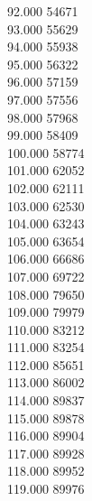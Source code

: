 { 92.000	54671 \\
 93.000	55629 \\
 94.000	55938 \\
 95.000	56322 \\
 96.000	57159 \\
 97.000	57556 \\
 98.000	57968 \\
 99.000	58409 \\
 100.000	58774 \\
 101.000	62052 \\
 102.000	62111 \\
 103.000	62530 \\
 104.000	63243 \\
 105.000	63654 \\
 106.000	66686 \\
 107.000	69722 \\
 108.000	79650 \\
 109.000	79979 \\
 110.000	83212 \\
 111.000	83254 \\
 112.000	85651 \\
 113.000	86002 \\
 114.000	89837 \\
 115.000	89878 \\
 116.000	89904 \\
 117.000	89928 \\
 118.000	89952 \\
 119.000	89976 \\
}
